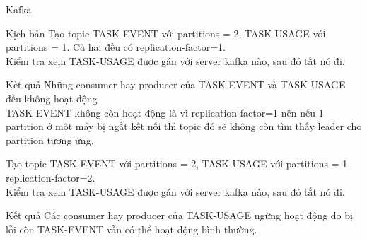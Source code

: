 \documentclass[10pt,xcolor={dvipsnames}]{beamer}
\begin{document}
	\begin{frame}
	{Kafka}
	\begin{block}
	{Kịch bản}
	Tạo topic TASK-EVENT với partitions = 2, TASK-USAGE với partitions = 1. Cả hai đều có replication-factor=1. \\
	Kiểm tra xem TASK-USAGE được gán với server kafka nào, sau đó tắt nó đi. 
	\end{block}
	
	\begin{block}
	{Kết quả}
	Những consumer hay producer của TASK-EVENT và TASK-USAGE đều không hoạt động \\ 
	TASK-EVENT không còn hoạt động là vì replication-factor=1 nên nếu 1 partition ở một máy bị ngắt kết nối thì topic đó sẽ không còn tìm thấy leader cho partition tương ứng. 
	\end{block}
	\end{frame}
	
	\begin{frame}
	\begin{block}
	Tạo topic TASK-EVENT với partitions = 2, TASK-USAGE với partitions = 1, replication-factor=2. \\
	Kiểm tra xem TASK-USAGE được gán với server kafka nào, sau đó tắt nó đi.
	\end{block}
	
	\begin{block}
	{Kết quả}
	Các consumer hay producer của TASK-USAGE ngừng hoạt động do bị lỗi còn TASK-EVENT vẫn có thể hoạt động bình thường. 
	\end{block}
	
	\end{frame}
	
\end{document}
